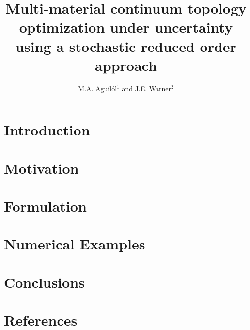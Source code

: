 \documentclass[a4paper]{jpconf}
\begin{document}
\title{Multi-material continuum topology optimization under uncertainty using a stochastic reduced order approach}
\author{M.A. Aguil\'ol$^1$ and J.E. Warner$^2$}

\address{$^1$ Sandia National Laboratories, 1515 Eubank SE, Albuquerque, NM 87123}
\address{$^2$ NASA Langley Research Center, 1 Nasa Dr, Hampton, VA 23666}


\begin{abstract}
\justify

\end{abstract}

\section{\label{sec:intro}Introduction}
\justify


\section{\label{sec:motivation}Motivation}


\section{\label{sec:formulation}Formulation}


\section{\label{sec:examples}Numerical Examples}


\section{\label{sec:conclusions}Conclusions}


\ack


\appendix

\section*{References}


\end{document}
